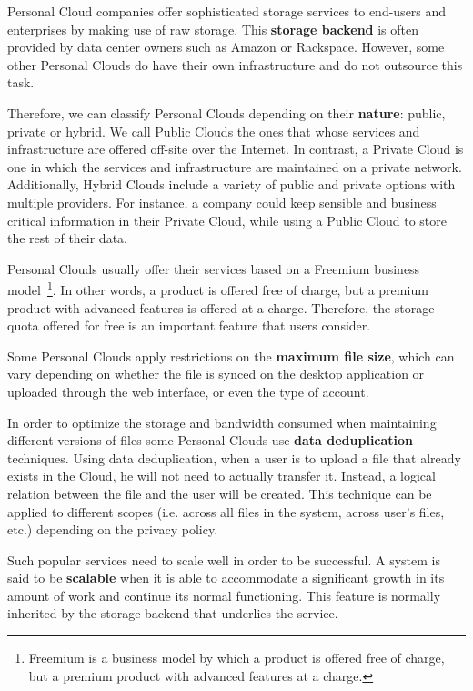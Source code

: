 Personal Cloud companies offer sophisticated storage services to end-users and enterprises by making use of raw storage. This \textbf{storage backend} is often provided by data center owners such as Amazon or Rackspace. However, some other Personal Clouds do have their own infrastructure and do not outsource this task.

Therefore, we can classify Personal Clouds depending on their \textbf{nature}: public, private or hybrid. We call Public Clouds the ones that whose services and infrastructure are offered off-site over the Internet. In contrast, a Private Cloud is one in which the services and infrastructure are maintained on a private network. Additionally, Hybrid Clouds include a variety of public and private options with multiple providers. For instance, a company could keep sensible and business critical information in their Private Cloud, while using a Public Cloud to store the rest of their data.

Personal Clouds usually offer their services based on a Freemium business model~\footnote{Freemium is a business model by which a product is offered free of charge, but a premium product with advanced features at a charge.}. In other words, a product is offered free of charge, but a premium product with advanced features is offered at a charge. Therefore, the storage quota offered for free is an important feature that users consider.

Some Personal Clouds apply restrictions on the \textbf{maximum file size}, which can vary depending on whether the file is synced on the desktop application or uploaded through the web interface, or even the type of account.

In order to optimize the storage and bandwidth consumed when maintaining different versions of files some Personal Clouds use \textbf{data deduplication} techniques. Using data deduplication, when a user is to upload a file that already exists in the Cloud, he will not need to actually transfer it. Instead, a logical relation between the file and the user will be created. This technique can be applied to different scopes (i.e. across all files in the system, across user's files, etc.) depending on the privacy policy.

Such popular services need to scale well in order to be successful. A system is said to be \textbf{scalable} when it is able to accommodate a significant growth in its amount of work and continue its normal functioning. This feature is normally inherited by the storage backend that underlies the service.

